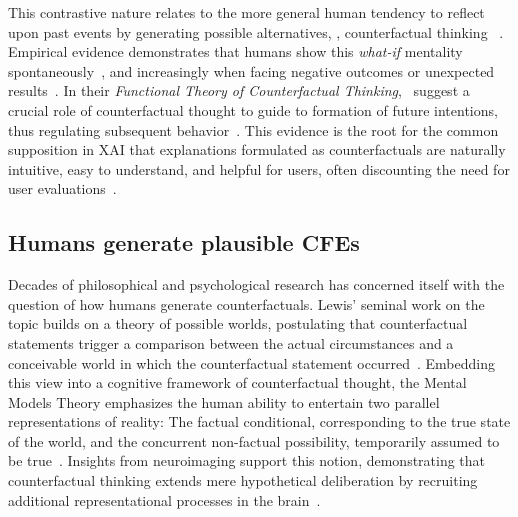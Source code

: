This contrastive nature relates to the more general human tendency to reflect upon past events by generating possible alternatives, \ie, counterfactual thinking ~\citep{roese_counterfactual_1997}.
Empirical evidence demonstrates that humans show this \textit{what-if} mentality spontaneously~\citep{goldinger_blaming_2003}, and increasingly when facing negative outcomes or unexpected results~\citep{sanna_antecedents_1996}.
In their \textit{Functional Theory of Counterfactual Thinking},~\citeauthor{roese_functional_2017} suggest a crucial role of counterfactual thought to guide to formation of future intentions, thus regulating subsequent behavior~\citep{roese_functional_2017,epstude_functional_2008}.
This evidence is the root for the common supposition in \gls{XAI} that explanations formulated as counterfactuals are naturally intuitive, easy to understand, and helpful for users, often discounting the need for user evaluations~\citep{stepin_paving_2019, dandl_multi-objective_2020, guidotti_local_2018, artelt_counterfactual_2020, artelt_efficient_2022}.

\subsection{Humans generate plausible CFEs}\label{subsubsec:psychoCFs_plausible}

Decades of philosophical and psychological research has concerned itself with the question of how humans generate counterfactuals. 
Lewis' seminal work on the topic builds on a theory of possible worlds, postulating that counterfactual statements trigger a comparison between the actual circumstances and a conceivable world in which the counterfactual statement occurred~\citep{lewis_counterfactuals_1973}.
Embedding this view into a cognitive framework of counterfactual thought, the Mental Models Theory emphasizes the human ability to entertain two parallel representations of reality: The factual conditional, corresponding to the true state of the world, and the concurrent non-factual possibility, temporarily assumed to be true~\citep{byrne_mental_2002,byrne_precis_2007,johnson-laird_conditionals_2002,walsh_mental_2005}.
Insights from neuroimaging support this notion, demonstrating that counterfactual thinking extends mere hypothetical deliberation by recruiting additional representational processes in the brain~\citep{kulakova_processing_2013}.

